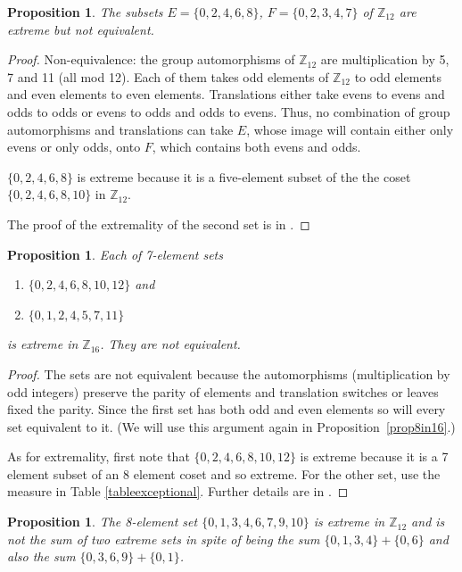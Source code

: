 \documentclass[letter,11pt]{amsart}
\numberwithin{theorem}{section}
\newtheorem{prop}[theorem]{Proposition}
\theoremstyle{remark}
\numberwithin{equation}{section}
\newcommand{\propref}[1]{Proposition~\ref{#1}}
\newcommand\Zp[2]{\texttt{$\mathbb Z_{#1}^{\	#2}$}}
\begin{document}
\begin{prop}
\cite{MR627683}
\label{prop5in12} The subsets $E=\{0,2,4,6,8\}$, $F=\{0,2,3,4,7\}$ of \Zp{12}{} are extreme but
not equivalent.
\end{prop}
\begin{proof}
Non-equivalence: 
the group automorphisms of \Zp{12}{} are multiplication by 5, 7 and 11 (all mod 12). Each of them takes odd elements of \Zp{12}{} to odd elements and even elements to even elements. Translations either take evens to evens and odds to odds or evens to odds and odds to evens. Thus, no combination of group automorphisms and translations can take 
$E$, whose image will contain either only evens or only odds, onto $F$, which contains both evens and odds.

$\{0,2,4,6,8\}$ is extreme because it is a five-element subset of the the coset  $\{0,2,4,6,8,10\}$ in \Zp{12}{}.

The proof of the extremality of the second set is in \cite{ABeastiaryAppendix}.
\end{proof}

\begin{prop}\label{prop7in16} Each of 7-element sets
\begin{enumerate}
\item
 $\{0,2,4,6,8,10,12\}$ and 
 \item $\{0,1,2,4,5,7,11\}$  
 \end{enumerate}
 is extreme in \Zp{16}{}.
They are not equivalent.
\end{prop}

\begin{proof}
The sets are  not equivalent because the automorphisms 
(multiplication by odd integers) preserve the parity  of
 elements and translation switches or leaves fixed the 
 parity. Since the first set has both odd and even elements
 so will every set equivalent to it. (We will use this argument
 again in \propref{prop8in16}.)
 
 As for extremality, first note that $\{0,2,4,6,8,10,12\}$ is extreme because it is a 7 element subset of an 8 element coset
and so extreme. For the other set, use the measure in Table \ref{tableexceptional}. Further details are
in \cite{ABeastiaryAppendix}.
\end{proof}

\begin{prop}\label{prop8in12} The 8-element set
$\{0,1,3,4,6,7,9,10\}$ %
 is extreme in \Zp{12}{} and is not the sum of two extreme sets in spite of being the sum $ \{0,1,3,4\} +\{0,6\}$
 and also the sum $\{0,3,6,9\}+\{0,1\}$.
\end{prop}
\end{document}
